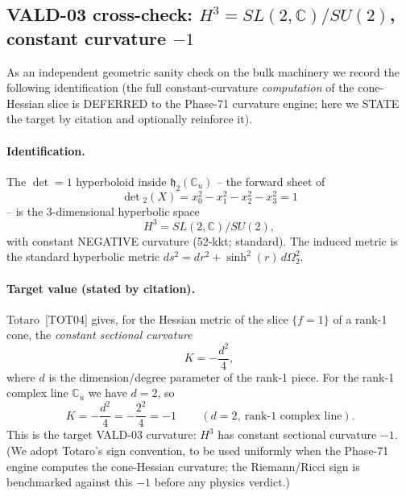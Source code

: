 \subsection{VALD-03 cross-check: $H^3 = SL(2,\mathbb{C})/SU(2)$, constant
  curvature $-1$}
\label{sec:h3}

As an independent geometric sanity check on the bulk machinery we record the
following identification (the full constant-curvature \emph{computation} of the
cone-Hessian slice is DEFERRED to the Phase-71 curvature engine; here we STATE the
target by citation and optionally reinforce it).

\paragraph{Identification.}
The $\det = 1$ hyperboloid inside $\mathfrak{h}_2(\mathbb{C}_u)$ -- the forward
sheet of
\begin{equation}
  \det{}_2(X) = x_0^2 - x_1^2 - x_2^2 - x_3^2 = 1
  \label{eq:h3-hyperboloid}
\end{equation}
-- is the $3$-dimensional hyperbolic space
\begin{equation}
  H^3 = SL(2,\mathbb{C})/SU(2),
  \label{eq:h3-identification}
\end{equation}
with constant NEGATIVE curvature (52-kkt; standard). The induced metric is the
standard hyperbolic metric $ds^2 = dr^2 + \sinh^2(r)\,d\Omega_2^2$.

\paragraph{Target value (stated by citation).}
Totaro~[TOT04] gives, for the Hessian metric of the slice $\{f = 1\}$ of a rank-1
cone, the \emph{constant sectional curvature}
\begin{equation}
  K = -\frac{d^2}{4},
  \label{eq:totaro}
\end{equation}
where $d$ is the dimension/degree parameter of the rank-1 piece. For the rank-1
complex line $\mathbb{C}_u$ we have $d = 2$, so
\begin{equation}
  \boxed{\,K = -\frac{d^2}{4} = -\frac{2^2}{4} = -1\,}
  \qquad (d = 2,\ \text{rank-1 complex line}).
  \label{eq:h3-target}
\end{equation}
This is the target VALD-03 curvature: $H^3$ has constant sectional curvature $-1$.
(We adopt Totaro's sign convention, to be used uniformly when the Phase-71 engine
computes the cone-Hessian curvature; the Riemann/Ricci sign is benchmarked against
this $-1$ before any physics verdict.)

